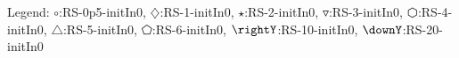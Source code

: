 Legend: {\color{NavyBlue}$\circ$}:RS-0p5-initIn0, {\color{Magenta}$\diamondsuit$}:RS-1-initIn0, {\color{Orange}$\star$}:RS-2-initIn0, {\color{CornflowerBlue}$\triangledown$}:RS-3-initIn0, {\color{red}$\varhexagon$}:RS-4-initIn0, {\color{YellowGreen}$\triangle$}:RS-5-initIn0, {\color{cyan}$\pentagon$}:RS-6-initIn0, {\color{GreenYellow}$\rightY$}:RS-10-initIn0, {\color{ForestGreen}$\downY$}:RS-20-initIn0